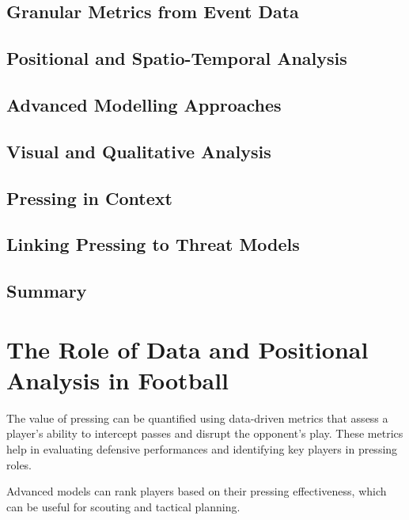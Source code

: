 \subsection{Granular Metrics from Event Data}


\subsection{Positional and Spatio-Temporal Analysis}



\subsection{Advanced Modelling Approaches}



\subsection{Visual and Qualitative Analysis}




\subsection{Pressing in Context}




\subsection{Linking Pressing to Threat Models}




\subsection{Summary}


\section{The Role of Data and Positional Analysis in Football}

The value of pressing can be quantified using data-driven metrics that assess a player's ability to intercept passes and disrupt the opponent's play. These metrics help in evaluating defensive performances and identifying key players in pressing roles.

Advanced models can rank players based on their pressing effectiveness, which can be useful for scouting and tactical planning.

